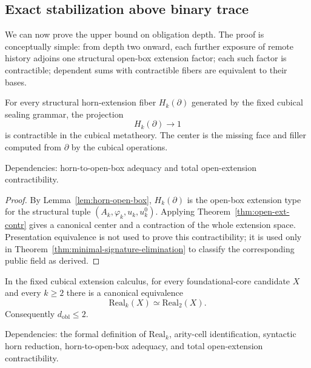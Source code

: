 \documentclass{lmcs}
\begin{document}
\subsection{Exact stabilization above binary trace}
\label{subsec:exact-stabilization}

We can now prove the upper bound on obligation depth.  The proof is conceptually simple:
from depth two onward, each further exposure of remote history adjoins one structural
open-box extension factor; each such factor is contractible; dependent sums with
contractible fibers are equivalent to their bases.

\begin{lem}
\label{lem:kan-contraction-horn-fibers}
For every structural horn-extension fiber \(H_k(\partial)\) generated by the fixed cubical
sealing grammar, the projection
\[
  H_k(\partial) \to 1
\]
is contractible in the cubical metatheory.  The center is the missing face and filler computed
from \(\partial\) by the cubical operations.

Dependencies: horn-to-open-box adequacy and total open-extension contractibility.
\end{lem}

\begin{proof}
By Lemma~\ref{lem:horn-open-box}, \(H_k(\partial)\) is the open-box extension type for the
structural tuple \((A_k,\varphi_k,u_k,u^0_k)\).  Applying
Theorem~\ref{thm:open-ext-contr} gives a canonical center and a contraction of the whole
extension space.  Presentation equivalence is not used to prove this contractibility; it is
used only in Theorem~\ref{thm:minimal-signature-elimination} to classify the corresponding
public field as derived.
\end{proof}

\begin{thm}
\label{thm:exact-stabilization}
In the fixed cubical extension calculus, for every foundational-core candidate \(X\) and
every \(k\geq 2\) there is a canonical equivalence
\[
  \mathrm{Real}_k(X) \simeq \mathrm{Real}_2(X).
\]
Consequently \(d_{\mathrm{obl}}\leq 2\).

Dependencies: the formal definition of \(\mathrm{Real}_k\), arity-cell identification,
syntactic horn reduction, horn-to-open-box adequacy, and total open-extension
contractibility.
\end{thm}
\end{document}
